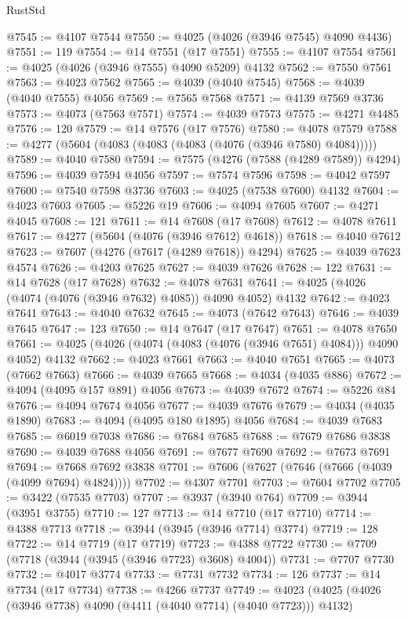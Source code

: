 \begin{lexlean}{RustStd}
\begin{coremodule}
@7545 := @4107 @7544
@7550 := @4025 (@4026 (@3946 @7545) @4090 @4436)
@7551 := 119
@7554 := @14 @7551 (@17 @7551)
@7555 := @4107 @7554
@7561 := @4025 (@4026 (@3946 @7555) @4090 @5209) @4132
@7562 := @7550 @7561
@7563 := @4023 @7562
@7565 := @4039 (@4040 @7545)
@7568 := @4039 (@4040 @7555) @4056
@7569 := @7565 @7568
@7571 := @4139 @7569 @3736
@7573 := @4073 (@7563 @7571)
@7574 := @4039 @7573
@7575 := @4271 @4485
@7576 := 120
@7579 := @14 @7576 (@17 @7576)
@7580 := @4078 @7579
@7588 := @4277 (@5604 (@4083 (@4083 (@4083 (@4076 (@3946 @7580) @4084)))))
@7589 := @4040 @7580
@7594 := @7575 (@4276 (@7588 (@4289 @7589)) @4294)
@7596 := @4039 @7594 @4056
@7597 := @7574 @7596
@7598 := @4042 @7597
@7600 := @7540 @7598 @3736
@7603 := @4025 (@7538 @7600) @4132
@7604 := @4023 @7603
@7605 := @5226 @19
@7606 := @4094 @7605
@7607 := @4271 @4045
@7608 := 121
@7611 := @14 @7608 (@17 @7608)
@7612 := @4078 @7611
@7617 := @4277 (@5604 (@4076 (@3946 @7612) @4618))
@7618 := @4040 @7612
@7623 := @7607 (@4276 (@7617 (@4289 @7618)) @4294)
@7625 := @4039 @7623 @4574
@7626 := @4203 @7625
@7627 := @4039 @7626
@7628 := 122
@7631 := @14 @7628 (@17 @7628)
@7632 := @4078 @7631
@7641 := @4025 (@4026 (@4074 (@4076 (@3946 @7632) @4085)) @4090 @4052) @4132
@7642 := @4023 @7641
@7643 := @4040 @7632
@7645 := @4073 (@7642 @7643)
@7646 := @4039 @7645
@7647 := 123
@7650 := @14 @7647 (@17 @7647)
@7651 := @4078 @7650
@7661 := @4025 (@4026 (@4074 (@4083 (@4076 (@3946 @7651) @4084))) @4090 @4052) @4132
@7662 := @4023 @7661
@7663 := @4040 @7651
@7665 := @4073 (@7662 @7663)
@7666 := @4039 @7665
@7668 := @4034 (@4035 @886)
@7672 := @4094 (@4095 @157 @891) @4056
@7673 := @4039 @7672
@7674 := @5226 @84
@7676 := @4094 @7674 @4056
@7677 := @4039 @7676
@7679 := @4034 (@4035 @1890)
@7683 := @4094 (@4095 @180 @1895) @4056
@7684 := @4039 @7683
@7685 := @6019 @7038
@7686 := @7684 @7685
@7688 := @7679 @7686 @3838
@7690 := @4039 @7688 @4056
@7691 := @7677 @7690
@7692 := @7673 @7691
@7694 := @7668 @7692 @3838
@7701 := @7606 (@7627 (@7646 (@7666 (@4039 (@4099 @7694) @4824))))
@7702 := @4307 @7701
@7703 := @7604 @7702
@7705 := @3422 (@7535 @7703)
@7707 := @3937 (@3940 @764)
@7709 := @3944 (@3951 @3755)
@7710 := 127
@7713 := @14 @7710 (@17 @7710)
@7714 := @4388 @7713
@7718 := @3944 (@3945 (@3946 @7714) @3774)
@7719 := 128
@7722 := @14 @7719 (@17 @7719)
@7723 := @4388 @7722
@7730 := @7709 (@7718 (@3944 (@3945 (@3946 @7723) @3608) @4004))
@7731 := @7707 @7730
@7732 := @4017 @3774
@7733 := @7731 @7732
@7734 := 126
@7737 := @14 @7734 (@17 @7734)
@7738 := @4266 @7737
@7749 := @4023 (@4025 (@4026 (@3946 @7738) @4090 (@4411 (@4040 @7714) (@4040 @7723))) @4132)

\end{coremodule}
\end{lexlean}
